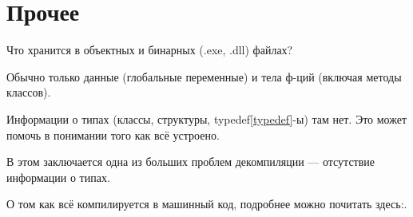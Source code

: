 ﻿\chapter{Прочее}

Что хранится в объектных и бинарных (.exe, .dll) файлах?

Обычно только данные (глобальные переменные) и тела ф-ций (включая методы классов).

Информации о типах (классы, структуры, typedef\ref{typedef}-ы) там нет. 
Это может помочь в понимании того как всё устроено.

В этом заключается одна из больших проблем декомпиляции --- отсутствие информации о типах.

О том как всё компилируется в машинный код, подробнее можно почитать здесь:\cite{REBook}.
